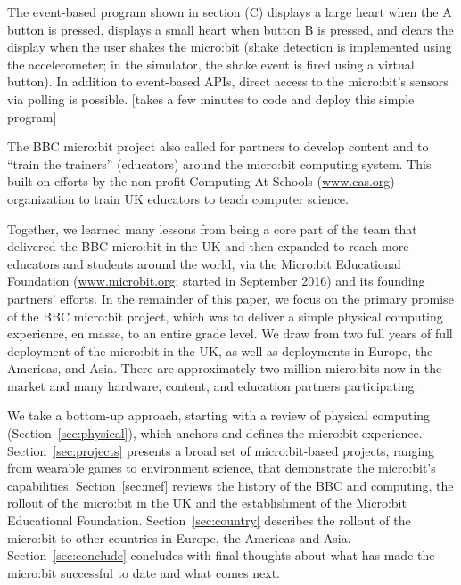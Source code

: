 The event-based program shown in section (C) displays a large heart when the
A button is pressed, displays a small heart when button B is pressed,
and clears the display when the user shakes the micro:bit (shake
detection is implemented using the accelerometer; in the simulator, the
shake event is fired using a virtual button). In addition to event-based
APIs, direct access to the micro:bit's sensors via polling is possible.
[takes a few minutes to code and deploy this simple program]

The BBC micro:bit project also called for partners to develop content
and to ``train the trainers'' (educators) around the micro:bit computing
system.  This built on efforts by the non-profit Computing At Schools
(\url{www.cas.org}) organization to train UK educators to teach computer
science. 




Together, we learned many lessons from being a core part of the team that
delivered the BBC micro:bit in the UK and then expanded to reach 
more educators and students around the world, via the Micro:bit Educational
Foundation (\url{www.microbit.org}; started in September 2016) and its 
founding partners' efforts.
In the remainder of this paper, we focus on the primary promise
of the BBC micro:bit project, which was to deliver a simple physical computing
experience, en masse, to an entire grade level.  We draw from two full years of 
full deployment of the micro:bit in the UK, as well as deployments
in Europe, the Americas, and Asia.  There are approximately
two million micro:bits now in the market and many hardware,
content, and education partners participating. 

We take a bottom-up approach, starting with a review of
physical computing (Section~\ref{sec:physical}), which anchors 
and defines the micro:bit experience. Section~\ref{sec:projects}
presents a broad set of micro:bit-based projects, ranging
from wearable games to environment science, that demonstrate
the micro:bit's capabilities.  Section~\ref{sec:mef} reviews
the history of the BBC and computing, the rollout of the
micro:bit in the UK and the establishment of the Micro:bit
Educational Foundation.  Section~\ref{sec:country}
describes the rollout of the micro:bit to other countries
in Europe, the Americas and Asia. Section~\ref{sec:conclude}
concludes with final thoughts about what has made the micro:bit
successful to date and what comes next. 


